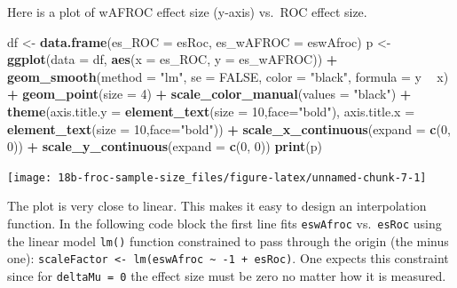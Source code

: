 \documentclass[
]{book}
\newenvironment{Shaded}{\begin{snugshade}}{\end{snugshade}}
\newcommand{\DataTypeTok}[1]{\textcolor[rgb]{0.13,0.29,0.53}{#1}}
\newcommand{\DecValTok}[1]{\textcolor[rgb]{0.00,0.00,0.81}{#1}}
\newcommand{\KeywordTok}[1]{\textcolor[rgb]{0.13,0.29,0.53}{\textbf{#1}}}
\newcommand{\NormalTok}[1]{#1}
\newcommand{\OperatorTok}[1]{\textcolor[rgb]{0.81,0.36,0.00}{\textbf{#1}}}
\newcommand{\OtherTok}[1]{\textcolor[rgb]{0.56,0.35,0.01}{#1}}
\newcommand{\StringTok}[1]{\textcolor[rgb]{0.31,0.60,0.02}{#1}}
\begin{document}
Here is a plot of wAFROC effect size (y-axis) vs.~ROC effect size.

\begin{Shaded}
\begin{Highlighting}[]
\NormalTok{df <-}\StringTok{ }\KeywordTok{data.frame}\NormalTok{(}\DataTypeTok{es_ROC =}\NormalTok{ esRoc, }\DataTypeTok{es_wAFROC =}\NormalTok{ eswAfroc)}
\NormalTok{p <-}\StringTok{ }\KeywordTok{ggplot}\NormalTok{(}\DataTypeTok{data =}\NormalTok{ df, }\KeywordTok{aes}\NormalTok{(}\DataTypeTok{x =}\NormalTok{ es_ROC, }\DataTypeTok{y =}\NormalTok{ es_wAFROC)) }\OperatorTok{+}
\StringTok{  }\KeywordTok{geom_smooth}\NormalTok{(}\DataTypeTok{method =} \StringTok{"lm"}\NormalTok{, }\DataTypeTok{se =} \OtherTok{FALSE}\NormalTok{, }\DataTypeTok{color =} \StringTok{"black"}\NormalTok{, }\DataTypeTok{formula =}\NormalTok{ y }\OperatorTok{~}\StringTok{ }\NormalTok{x) }\OperatorTok{+}
\StringTok{  }\KeywordTok{geom_point}\NormalTok{(}\DataTypeTok{size =} \DecValTok{4}\NormalTok{) }\OperatorTok{+}
\StringTok{  }\KeywordTok{scale_color_manual}\NormalTok{(}\DataTypeTok{values =} \StringTok{"black"}\NormalTok{) }\OperatorTok{+}\StringTok{ }
\StringTok{  }\KeywordTok{theme}\NormalTok{(}\DataTypeTok{axis.title.y =} \KeywordTok{element_text}\NormalTok{(}\DataTypeTok{size =} \DecValTok{10}\NormalTok{,}\DataTypeTok{face=}\StringTok{"bold"}\NormalTok{),}
        \DataTypeTok{axis.title.x =} \KeywordTok{element_text}\NormalTok{(}\DataTypeTok{size =} \DecValTok{10}\NormalTok{,}\DataTypeTok{face=}\StringTok{"bold"}\NormalTok{)) }\OperatorTok{+}
\StringTok{  }\KeywordTok{scale_x_continuous}\NormalTok{(}\DataTypeTok{expand =} \KeywordTok{c}\NormalTok{(}\DecValTok{0}\NormalTok{, }\DecValTok{0}\NormalTok{)) }\OperatorTok{+}\StringTok{ }
\StringTok{  }\KeywordTok{scale_y_continuous}\NormalTok{(}\DataTypeTok{expand =} \KeywordTok{c}\NormalTok{(}\DecValTok{0}\NormalTok{, }\DecValTok{0}\NormalTok{)) }
\KeywordTok{print}\NormalTok{(p)}
\end{Highlighting}
\end{Shaded}

\begin{center}\texttt{[image: 18b-froc-sample-size\_files/figure-latex/unnamed-chunk-7-1]} \end{center}

The plot is very close to linear. This makes it easy to design an interpolation function. In the following code block the first line fits \texttt{eswAfroc} vs.~\texttt{esRoc} using the linear model \texttt{lm()} function constrained to pass through the origin (the minus one): \texttt{scaleFactor\ \textless{}-\ lm(eswAfroc\ \textasciitilde{}\ -1\ +\ esRoc)}. One expects this constraint since for \texttt{deltaMu\ =\ 0} the effect size must be zero no matter how it is measured.
\end{document}
